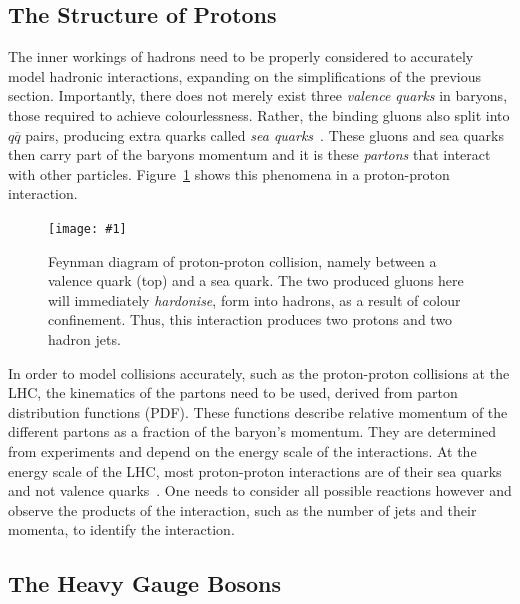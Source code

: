 \documentclass[twocolumn]{article}
\newcommand{\insertFigure}[1]{%
   \texttt{[image: \#1]}%
}
\begin{document}
\subsection{The Structure of Protons} 
The inner workings of hadrons need to be properly considered to accurately model hadronic interactions, expanding on the simplifications of the previous section. Importantly, there does not merely exist three \textsl{valence quarks} in baryons, those required to achieve colourlessness. Rather, the binding gluons also split into $q\overline{q}$ pairs, producing extra quarks called \textsl{sea quarks}~\cite{manual}. These gluons and sea quarks then carry part of the baryons momentum and it is these \textsl{partons} that interact with other particles. Figure~\ref{fig:parton} shows this phenomena in a proton-proton interaction.
\begin{figure}[!h]
	\centering
	\insertFigure{Images/parton.png}
	\caption{Feynman diagram of proton-proton collision, namely between a valence quark (top) and a sea quark. The two produced gluons here will immediately \textsl{hardonise}, form into hadrons, as a result of colour confinement. Thus, this interaction produces two protons and two hadron jets.~\cite{manual}}
	\label{fig:parton}
\end{figure}
In order to model collisions accurately, such as the proton-proton collisions at the LHC, the kinematics of the partons need to be used, derived from parton distribution functions (PDF). These functions describe relative momentum of the different partons as a fraction of the baryon's momentum. They are determined from experiments and depend on the energy scale of the interactions. At the energy scale of the LHC, most proton-proton interactions are of their sea quarks and not valence quarks~\cite{manual}. One needs to consider all possible reactions however and observe the products of the interaction, such as the number of jets and their momenta, to identify the interaction.

\subsection{The Heavy Gauge Bosons\cite{manual}}%
\end{document}
